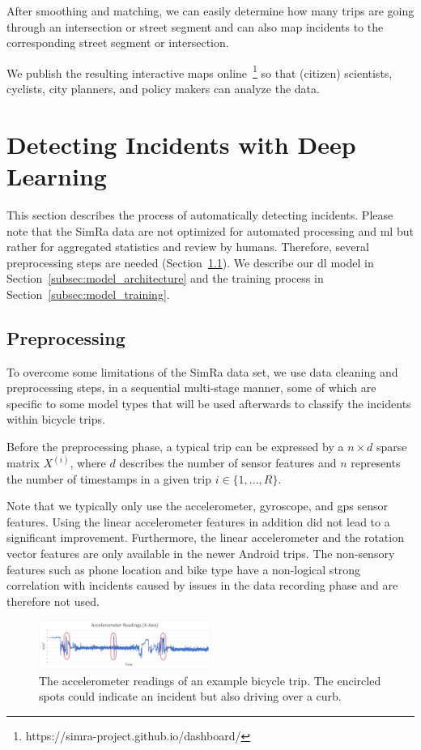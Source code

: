 After smoothing and matching, we can easily determine how many trips are going through an intersection or street segment and can also map incidents to the corresponding street segment or intersection.

We publish the resulting interactive maps online~\footnote{https://simra-project.github.io/dashboard/} so that (citizen) scientists, cyclists, city planners, and policy makers can analyze the data.

\section{Detecting Incidents with Deep Learning}
\label{sec:detecting_near_miss_incidents}
This section describes the process of automatically detecting incidents.
Please note that the SimRa data are not optimized for automated processing and \ac{ml} but rather for aggregated statistics and review by humans.
Therefore, several preprocessing steps are needed (Section~\ref{subsec:preprocessing}).
We describe our \ac{dl} model in Section~\ref{subsec:model_architecture} and the training process in Section~\ref{subsec:model_training}.


\subsection{Preprocessing}
\label{subsec:preprocessing}
To overcome some limitations of the SimRa data set, we use data cleaning and preprocessing steps, in a sequential multi-stage manner, some of which are specific to some model types that will be used afterwards to classify the incidents within bicycle trips.

Before the preprocessing phase, a typical trip can be expressed by a $n \times d$ sparse matrix $X^{(i)}$, where $d$ describes the number of sensor features and $n$ represents the number of timestamps in a given trip $i \in \{1,...,R\}$.

Note that we typically only use the accelerometer, gyroscope, and \ac{gps} sensor features.
Using the linear accelerometer features in addition did not lead to a significant improvement.
Furthermore, the linear accelerometer and the rotation vector features are only available in the newer Android trips.
The non-sensory features such as phone location and bike type have a non-logical strong correlation with incidents caused by issues in the data recording phase and are therefore not used.

\begin{figure}[t]
	\centering
	\includegraphics[width=0.5\textwidth]{fig/accelerometer-x-axis.png}
	\caption{The accelerometer readings of an example bicycle trip. The encircled spots could indicate an incident but also driving over a curb.}
	\label{fig:x-axis}
\end{figure}

